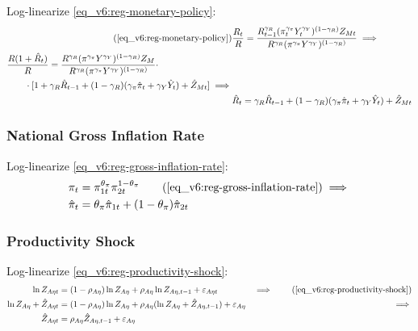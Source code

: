 \documentclass[../thesis.tex]{subfiles}
\begin{document}
Log-linearize \ref{eq_v6:reg-monetary-policy}:
\begin{align}
	\tag{\ref{eq_v6:reg-monetary-policy}}
	& \frac{R_{t}}{R} = \frac{R_{t-1}^{\gamma_{R}} (\pi_t^{\gamma_{\pi}} Y_{t}^{\gamma_{Y}})^{(1-\gamma_{R})} Z_{Mt}}{R^{\gamma_{R}} (\pi^{\gamma_{\pi}} Y^{\gamma_{Y}})^{(1-\gamma_{R})}} \implies \\
	\begin{split}
		& \frac{R(1+ \hat{R}_t)}{R} = \frac{ R^{\gamma_{R}} (\pi^{\gamma_{\pi}} Y^{\gamma_{Y}})^{(1-\gamma_{R})} Z_{M}}{R^{\gamma_{R}} (\pi^{\gamma_{\pi}} Y^{\gamma_{Y}})^{(1-\gamma_{R})}} \cdot \\
		& \qquad \cdot [1+ \gamma_{R} \hat{R}_{t-1} + (1-\gamma_{R})(\gamma_{\pi} \hat{\pi}_t + \gamma_{Y} \hat{Y}_t) + \hat{Z}_{Mt}] \implies
	\end{split} \nonumber \\
	& \hat{R}_t = \gamma_{R} \hat{R}_{t-1} + (1-\gamma_{R})(\gamma_{\pi} \hat{\pi}_t + \gamma_{Y} \hat{Y}_t) + \hat{Z}_{Mt} \label{eq_v6:reg-ll-monetary-policy}
\end{align}


\subsubsection*{National Gross Inflation Rate}

Log-linearize \ref{eq_v6:reg-gross-inflation-rate}:
\begin{align}
	\pi_{t} &= \pi_{1t}^{\theta_{\pi}} \pi_{2t}^{1 - \theta_{\pi}} \tag{\ref{eq_v6:reg-gross-inflation-rate}} \implies \nonumber \\
	\hat{\pi}_{t} &= \theta_{\pi} \hat{\pi}_{1t} + (1 - \theta_{\pi}) \hat{\pi}_{2t} \label{eq_v6:reg-gross-inflation-rate-ll}
\end{align}


\subsubsection*{Productivity Shock}

Log-linearize \ref{eq_v6:reg-productivity-shock}:
\begin{alignat}{2}
	\ln{Z_{A\eta t}} &= (1-\rho_{A\eta})\ln{Z_{A\eta}} + \rho_{A\eta}\ln{Z_{A\eta,t-1}} + \varepsilon_{A\eta t} &\implies \tag{\ref{eq_v6:reg-productivity-shock}} \\
	\ln{Z_{A\eta}} + \hat{Z}_{A\eta t} &= (1-\rho_{A\eta}) \ln{Z_{A\eta}} + \rho_{A\eta} (\ln{Z_{A\eta}} + \hat{Z}_{A\eta, t-1}) + \varepsilon_{A\eta} &\implies \nonumber \\
	\hat{Z}_{A\eta t} &= \rho_{A\eta} \hat{Z}_{A\eta, t-1} + \varepsilon_{A\eta} \label{eq_v6:reg-ll-productivity-shock}
\end{alignat}
\end{document}

